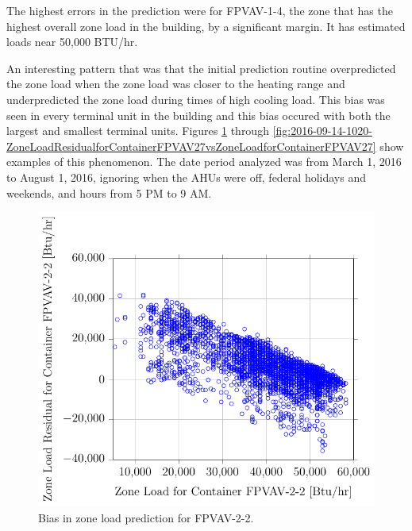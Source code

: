 The highest errors in the prediction were for FPVAV-1-4, the zone that has the highest overall zone load in the building, by a significant margin. It has estimated loads near 50,000 BTU/hr.



An interesting pattern that was that the initial prediction routine overpredicted the zone load when the zone load was closer to the heating range and underpredicted the zone load during times of high cooling load. This bias was seen in every terminal unit in the building and this bias occured with both the largest and smallest terminal units. Figures \ref{fig:2016-09-14-1028-ZoneLoadResidualforContainerFPVAV22vsZoneLoadforContainerFPVAV22} through \ref{fig:2016-09-14-1020-ZoneLoadResidualforContainerFPVAV27vsZoneLoadforContainerFPVAV27} show examples of this phenomenon. The date period analyzed was from March 1, 2016 to August 1, 2016, ignoring when the AHUs were off, federal holidays and weekends, and hours from 5 PM to 9 AM. 

\newcommand{\zoneLoadCaption}[1]{Bias in zone load prediction for #1.}

\begin{figure}
\centering
\includegraphics[]{Plots/2016-09-14-1028-ZoneLoadResidualforContainerFPVAV22vsZoneLoadforContainerFPVAV22.pdf}
\caption{\zoneLoadCaption{FPVAV-2-2}}
\label{fig:2016-09-14-1028-ZoneLoadResidualforContainerFPVAV22vsZoneLoadforContainerFPVAV22}
\end{figure}

